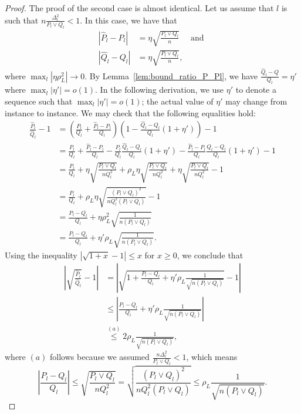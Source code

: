 \documentclass{article}
\begin{document}
\begin{proof}
The proof of the second case is almost identical. Let us assume that $l$ is such that $n \frac{\Delta_l^2}{P_l \vee Q_l} < 1$. In this case, we have that
\begin{align*}
| \hat{P}_l - P_l | &= \eta \sqrt{ \frac{P_l \vee Q_l}{n} } \quad \text{ and } \\
| \hat{Q}_l - Q_l | &= \eta \sqrt{ \frac{P_l \vee Q_l}{n} },
\end{align*}
where  $\max_l |\eta \rho_L^2| \rightarrow 0$. By Lemma~\ref{lem:bound_ratio_P_Pl}, we have $\frac{\hat{Q}_l - Q}{Q_l} = \eta'$ where $\max_l |\eta'| = o(1)$. In the following derivation, we use $\eta'$ to denote a sequence such that $\max_l |\eta'| = o(1)$; the actual value of $\eta'$ may change from instance to instance. We may check that the following equalities hold:
\begin{align*}
\frac{\hat{P}_l}{\hat{Q}_l} - 1 &= 
     \left( \frac{P_l}{Q_l} + \frac{\hat{P}_l - P_l}{Q_l} \right)
     \left( 1 - \frac{\hat{Q}_l - Q_l}{Q_l} ( 1 + \eta') \right) - 1 \\
 &= \frac{P_l}{Q_l} + \frac{\hat{P}_l - P_l}{Q_l} 
     - \frac{P_l}{Q_l} \frac{\hat{Q}_l - Q_l}{Q_l} (1 + \eta') 
     - \frac{\hat{P}_l - P_l}{Q_l} \frac{\hat{Q}_l - Q_l}{Q_l}(1+ \eta') 
   - 1  \\
&= \frac{P_l }{Q_l}  + \eta \sqrt{\frac{P_l \vee Q_l}{nQ_l^2}} + \rho_L \eta \sqrt{\frac{P_l \vee Q_l}{nQ_l^2}} + \eta \sqrt{\frac{P_l \vee Q_l}{nQ_l^2}} -1\\ 
%
&= \frac{P_l }{Q_l}  + \rho_L \eta \sqrt{\frac{(P_l \vee Q_l)^2}{nQ_l^2(P_l \vee Q_l)}} -1\\ 
%
&= \frac{P_l - Q_l}{Q_l}  + \eta \rho_L^2 \sqrt{\frac{1}{n(P_l \vee Q_l)}}\\
%
 &= \frac{P_l - Q_l}{Q_l} + \eta' \rho_L \sqrt{ \frac{1}{ n (P_l \vee Q_l)} } .
\end{align*}
Using the inequality $|\sqrt{1+x}-1| \leq x$ for $x \geq 0$, we conclude that
\begin{align*}
\left| \sqrt{ \frac{\hat{P}_l}{\hat{Q}_l} } - 1 \right| &= 
 \left|  \sqrt{ 1 + \frac{P_l - Q_l}{Q_l} + \eta' \rho_L \frac{1}{\sqrt{n (P_l \vee Q_l)} }}
   -1  \right| \\
  &\leq \left| \frac{P_l - Q_l}{Q_l} + \eta' \rho_L \frac{1}{\sqrt{ n (P_l \vee Q_l)}}    \right| \\
 &\stackrel{(a)} \leq 2 \rho_L \frac{1}{\sqrt{n (P_l \vee Q_l)} }, 
\end{align*}
where $(a)$ follows because we assumed $\frac{n\Delta_l^2}{P_l \vee Q_l} <1$, which means
$$ \left| \frac{P_l - Q_l}{Q_l} \right|\leq \sqrt{\frac{P_l \vee Q_l}{n Q_l^2}} =  \sqrt{\frac{(P_l \vee Q_l)^2}{n Q_l^2(P_l \vee Q_l)}} \leq \rho_L \frac{1}{\sqrt{n(P_l \vee Q_l)}}.$$
\end{proof}
\end{document}
